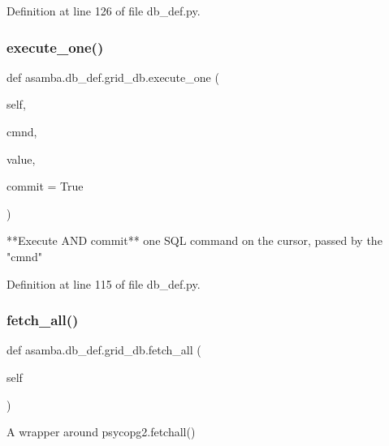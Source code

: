 Definition at line 126 of file db\+\_\+def.\+py.

\mbox{\label{classasamba_1_1db__def_1_1grid__db_a818c15b631b12709a243334f8757066c}} 
\subsubsection{\texorpdfstring{execute\+\_\+one()}{execute\_one()}}
{\footnotesize\ttfamily def asamba.\+db\+\_\+def.\+grid\+\_\+db.\+execute\+\_\+one (\begin{DoxyParamCaption}\item[{}]{self,  }\item[{}]{cmnd,  }\item[{}]{value,  }\item[{}]{commit = {\ttfamily True} }\end{DoxyParamCaption})}

\begin{DoxyVerb}**Execute AND commit** one SQL command on the cursor, passed by the "cmnd"
\end{DoxyVerb}
 

Definition at line 115 of file db\+\_\+def.\+py.

\mbox{\label{classasamba_1_1db__def_1_1grid__db_aff28a89e835e0a22e3a7c2593a165179}} 
\subsubsection{\texorpdfstring{fetch\+\_\+all()}{fetch\_all()}}
{\footnotesize\ttfamily def asamba.\+db\+\_\+def.\+grid\+\_\+db.\+fetch\+\_\+all (\begin{DoxyParamCaption}\item[{}]{self }\end{DoxyParamCaption})}

\begin{DoxyVerb}A wrapper around psycopg2.fetchall()
\end{DoxyVerb}
 

